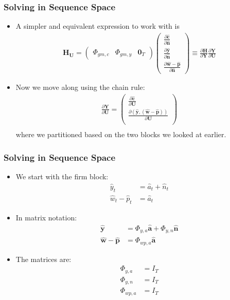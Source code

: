 \documentclass[english,xcolor=svgnames]{beamer}
\begin{document}
	
	\begin{frame}
		\frametitle{Solving in Sequence Space}
			\begin{itemize}
				\item A simpler and equivalent expression to work with is
				\begin{align*}
					\mathbf{H}_{\mathbf{U}} = \begin{pmatrix}
						\Phi_{gm,c}  & \Phi_{gm,y}  & \mathbf{0}_T 
					\end{pmatrix}
					\begin{pmatrix}
						\frac{\partial\mathbf{\hat{c}}}{\partial \mathbf{\hat{n}} } \\ 
						\frac{\partial\mathbf{\hat{y}}}{\partial \mathbf{\hat{n}} } \\
						\frac{\partial\mathbf{\hat{w}-\hat{p}}}{\partial \mathbf{\hat{n}} } 
					\end{pmatrix} \equiv \frac{\partial \mathbf{H}}{\partial \mathbf{Y}}\frac{\partial \mathbf{Y}}{\partial \mathbf{U}}
				\end{align*}
				\item Now we move along using the chain rule:
				\begin{align*}
					\frac{\partial \mathbf{Y}}{\partial \mathbf{U}} = \begin{pmatrix}
						\frac{\partial \mathbf{\hat{c}}}{\partial \mathbf{U}} \\
						\frac{\partial (\mathbf{\hat{y}},\mathbf{(\hat{w}-\hat{p})})}{\partial \mathbf{U}}\\
					\end{pmatrix} \\
				\end{align*}
				where we partitioned based on the two blocks we looked at earlier.
			\end{itemize}
	\end{frame}
	
	
	\begin{frame}
		\frametitle{Solving in Sequence Space}
			\begin{itemize}
				\item We start with the firm block:
				\begin{align*}
					\hat{y}_t&=\hat{a}_t + \hat{n}_{t} \\
					\hat{w}_t - \hat{p}_t &= \hat{a}_t 
				\end{align*}
				\item In matrix notation:
				\begin{align*}
					\mathbf{\hat{y}} &= \Phi_{y,a}\mathbf{\hat{a}} + \Phi_{y,n}\mathbf{\hat{n}} \\
					\mathbf{\hat{w}-\hat{p}} &= \Phi_{wp,a}\mathbf{\hat{a}}
				\end{align*}
				\item The matrices are:
				\begin{align*}
					\Phi_{y,a}&=I_T\\
					\Phi_{y,n}&=I_T \\
					\Phi_{wp,a}&=I_T 
				\end{align*}
			\end{itemize}
	\end{frame}
\end{document}
